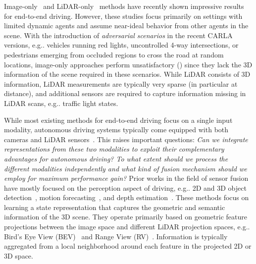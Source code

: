 \documentclass[final]{cvpr}
\makeatletter
\DeclareRobustCommand\onedot{\futurelet\@let@token\@onedot}
\def\@onedot{\ifx\@let@token.\else.\null\fi\xspace}
\def\eg{e.g\onedot} \def\Eg{E.g\onedot}
\makeatother
\begin{document}
Image-only~\cite{Codevilla2019ICCV, Chen2019CORL, Ohn-Bar2020CVPR, Behl2020IROS, Prakash2020CVPR, Zhao2019ARXIV, Toromanoff2020CVPR} and LiDAR-only~\cite{Rhinehart2020ICLR, Filos2020ICML} methods have recently shown impressive results for end-to-end driving. However, these studies focus primarily on settings with limited dynamic agents and assume near-ideal behavior from other agents in the scene. With the introduction of \textit{adversarial scenarios} in the recent CARLA~\cite{Dosovitskiy2017CORL} versions, \eg vehicles running red lights, uncontrolled 4-way intersections, or pedestrians emerging from occluded regions to cross the road at random locations, image-only approaches perform unsatisfactory () since they lack the 3D information of the scene required in these scenarios. While LiDAR consists of 3D information, LiDAR measurements are typically very sparse (in particular at distance), and additional sensors are required to capture information missing in LiDAR scans, \eg traffic light states.

While most existing methods for end-to-end driving focus on a single input modality, autonomous driving systems typically come equipped with both cameras and LiDAR sensors~\cite{Dosovitskiy2017CORL, Richter2016ECCV, Gaidon2016CVPR, Xu2017CVPRa, Cordts2016CVPR, Geiger2012CVPR, Ros2016CVPR, Waymo2019, Yu2018ARXIV}. This raises important questions: \textit{Can we integrate representations from these two modalities to exploit their complementary advantages for autonomous driving? To what extent should we process the different modalities independently and what kind of fusion mechanism should we employ for maximum performance gain?} Prior works in the field of {sensor fusion} have mostly focused on the perception aspect of driving, \eg 2D and 3D object detection~\cite{Fadadu2020ARXIV, Chen2017CVPR, Zhou2019CORL, Chen2020ARXIV, Qi2018CVPR, Ku2018IROSa, Liang2018ECCV, You2020ICLR, Liang2019CVPR, Meyer2019CVPRW}, motion forecasting~\cite{Fadadu2020ARXIV, Luo2018CVPR, Casas2020ICRA, Liang2020CVPR, Zhang2020CVPR, Casas2018CORL, Djuric2020ARXIV, Meyer2020ARXIV, Li2020IROS, Chen2020ARXIV}, and depth estimation~\cite{Fu2020ARXIV, Xu2019ICCV, You2020ICLR, Liang2019CVPR}. These methods focus on learning a state representation that captures the geometric and semantic information of the 3D scene. They operate primarily based on geometric feature projections between the image space and different LiDAR projection spaces, \eg Bird's Eye View (BEV)~\cite{Fadadu2020ARXIV, Chen2017CVPR, Zhou2019CORL, Chen2020ARXIV, Qi2018CVPR, Ku2018IROSa, Liang2018ECCV, You2020ICLR, Liang2019CVPR} and Range View (RV)~\cite{Meyer2019CVPR, Meyer2019CVPRW, Fadadu2020ARXIV, Meyer2020ARXIV, Chen2020ARXIV, Sobh2018NEURIPSW}. Information is typically aggregated from a local neighborhood around each feature in the projected 2D or 3D space. 
\end{document}
